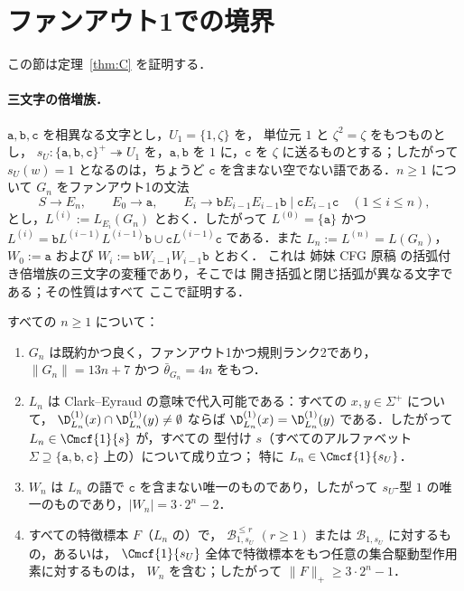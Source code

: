 
\section{ファンアウト1での境界}
\label{sec:fanout-one}

この節は定理~\ref{thm:C} を証明する．

\paragraph{三文字の倍増族．}
$\mathtt a,\mathtt b,\mathtt c$ を相異なる文字とし，$U_1=\{1,\zeta\}$ を，
単位元 $1$ と $\zeta^2=\zeta$ をもつものとし，
$s_U:\{\mathtt a,\mathtt b,\mathtt c\}^+\twoheadrightarrow U_1$ を，$\mathtt a,\mathtt b$
を $1$ に，$\mathtt c$ を $\zeta$ に送るものとする；したがって $s_U(w)=1$ となるのは，ちょうど
$\mathtt c$ を含まない空でない語である．$n\ge1$ について $G_n$ をファンアウト1の文法
\[
 S\to E_n,\qquad E_0\to\mathtt a,\qquad
 E_i\to\mathtt bE_{i-1}E_{i-1}\mathtt b\mid\mathtt cE_{i-1}\mathtt c\quad(1\le i\le n),
\]
とし，$L^{(i)}:=L_{E_i}(G_n)$ とおく．したがって $L^{(0)}=\{\mathtt a\}$ かつ
$L^{(i)}=\mathtt bL^{(i-1)}L^{(i-1)}\mathtt b\cup\mathtt cL^{(i-1)}\mathtt c$ である．また
$L_n:=L^{(n)}=L(G_n)$，$W_0:=\mathtt a$ および $W_i:=\mathtt bW_{i-1}W_{i-1}\mathtt b$ とおく．
これは
姉妹 CFG 原稿 \cite[Proposition~6.4]{kuriyamaCFG} の括弧付き倍増族の三文字の変種であり，そこでは
開き括弧と閉じ括弧が異なる文字である；その性質はすべて
ここで証明する．

\begin{proposition}[三文字の倍増族]
\label{prop:bracketed-family}
\label{prop:three-letter-family}
すべての $n\ge1$ について：
\begin{enumerate}[label=\textup{(\roman*)},leftmargin=*]
\item $G_n$ は既約かつ良く，ファンアウト1かつ規則ランク2であり，
$\|G_n\|=13n+7$ かつ $\bar\theta_{G_n}=4n$ をもつ．
\item $L_n$ は Clark--Eyraud の意味で代入可能である：すべての $x,y\in\Sigma^+$ について，
$\D^{(1)}_{L_n}(x)\cap\D^{(1)}_{L_n}(y)\ne\emptyset$ ならば
$\D^{(1)}_{L_n}(x)=\D^{(1)}_{L_n}(y)$ である．したがって $L_n\in\Cmcf{1}{s}$ が，すべての
型付け $s$（すべてのアルファベット $\Sigma\supseteq\{\mathtt a,\mathtt b,\mathtt c\}$ 上の）について成り立つ；
特に $L_n\in\Cmcf{1}{s_U}$．
\item $W_n$ は $L_n$ の語で $\mathtt c$ を含まない唯一のものであり，したがって
$s_U$-型 $1$ の唯一のものであり，$|W_n|=3\cdot2^n-2$．
\item すべての特徴標本 $F$（$L_n$ の）で，
$\mathcal B^{\le r}_{1,s_U}$ $(r\ge1)$ または $\mathcal B_{1,s_U}$ に対するもの，あるいは，
$\Cmcf{1}{s_U}$ 全体で特徴標本をもつ任意の集合駆動型作用素に対するものは，
$W_n$ を含む；したがって $\|F\|_+\ge3\cdot2^n-1$．
\end{enumerate}
\end{proposition}

